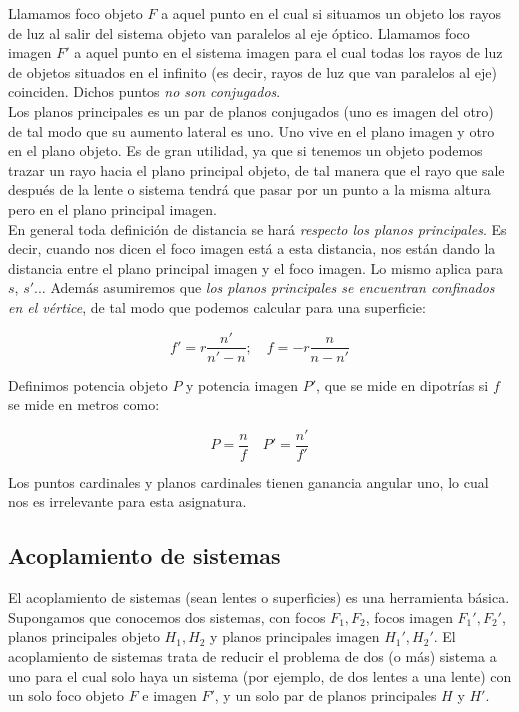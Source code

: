 \documentclass[12pt,a4paper]{article}
\numberwithin{equation}{section}
\numberwithin{figure}{section}
\begin{document}
Llamamos foco objeto $F$ a aquel punto en el cual si situamos un objeto los rayos de luz al salir del sistema objeto van paralelos al eje óptico. Llamamos foco imagen $F'$ a aquel punto en el sistema imagen para el cual todas los rayos de luz de objetos situados en el infinito (es decir, rayos de luz que van paralelos al eje) coinciden. Dichos puntos \textit{no son conjugados}.  \\

Los planos principales es un par de planos conjugados (uno es imagen del otro) de tal modo que su aumento lateral es uno. Uno vive en el plano imagen y otro en el plano objeto. Es de gran utilidad, ya que si tenemos un objeto podemos trazar un rayo hacia el plano principal objeto, de tal manera que el rayo que sale después de la lente o sistema tendrá que pasar por un punto a la misma altura pero en el plano principal imagen. \\

En general toda definición de distancia se hará \textit{respecto los planos principales}. Es decir, cuando nos dicen el foco imagen está a esta distancia, nos están dando la distancia entre el plano principal imagen y el foco imagen. Lo mismo aplica para $s$, $s'$... Además asumiremos que \textit{los planos principales se encuentran confinados en el vértice}, de tal modo que podemos calcular para una superficie:

\begin{equation}
f' = r \dfrac{n'}{n'-n}; \quad f = -r \dfrac{n}{n-n'}
\end{equation}

Definimos potencia objeto $P$ y potencia imagen $P'$, que se mide en dipotrías si $f$ se mide en metros como:

\begin{equation}
P = \dfrac{n}{f} \quad P' = \dfrac{n'}{f'} \label{Ec:potencia}
\end{equation}

Los puntos cardinales y planos cardinales tienen ganancia angular uno, lo cual nos es irrelevante para esta asignatura.

\subsection{Acoplamiento de sistemas}

El acoplamiento de sistemas (sean lentes o superficies) es una herramienta básica. Supongamos que conocemos dos sistemas, con focos $F_1, F_2$, focos imagen $F_1',F_2'$, planos principales objeto $H_1,H_2$ y planos principales imagen $H_1',H_2'$. El acoplamiento de sistemas trata de reducir el problema de dos (o más) sistema a uno para el cual solo haya un sistema (por ejemplo, de dos lentes a una lente) con un solo foco objeto $F$ e imagen $F'$, y un solo par de planos principales $H$ y $H'$. \\
\end{document}
